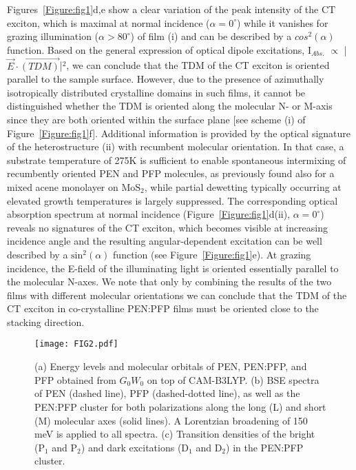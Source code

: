 \documentclass[journal=jpclcd,manuscript=letter]{achemso}
\begin{document}
Figures~\ref{Figure:fig1}d,e show a clear variation of the peak intensity of the CT exciton, which is maximal at normal incidence ($\alpha= 0^{\circ}$) while it vanishes for grazing illumination ($\alpha > 80^{\circ}$) of film (i) and can be described by a $cos^2(\alpha)$ function. Based on the general expression of optical dipole excitations, I$_{Abs.}$  $\propto$ | $\vec{E} \cdot \vec{(TDM)}$|$^2$, we can conclude that the TDM of the CT exciton is oriented parallel to the sample surface. However, due to the presence of azimuthally isotropically distributed  crystalline domains in such films, it cannot be distinguished whether the TDM is oriented along the molecular N- or M-axis since they are both oriented within the surface plane [see scheme (i) of Figure~\ref{Figure:fig1}f]. Additional information is provided by the optical signature of the heterostructure (ii) with recumbent molecular orientation. In that case, a substrate temperature of 275K is sufficient to enable spontaneous intermixing of recumbently oriented PEN and PFP molecules, as previously found also for a mixed acene monolayer on $\mathrm{MoS_2}$,\cite{kach+21cs} while partial dewetting typically occurring at elevated growth temperatures is largely suppressed. The corresponding optical absorption spectrum at normal incidence (Figure~\ref{Figure:fig1}d(ii), $\alpha= 0^{\circ}$) reveals no signatures of the CT exciton, which becomes visible at increasing incidence angle and the resulting angular-dependent excitation can be well described by a $\mathrm{sin^2}(\alpha )$ function (see Figure~\ref{Figure:fig1}e). At grazing incidence, the E-field of the illuminating light is oriented essentially parallel to the molecular N-axes. We note that only by combining the results of the two films with different molecular orientations we can conclude that the TDM of the CT exciton in co-crystalline PEN:PFP films must be oriented close to the stacking direction.


%
\begin{figure}[h!]
	\centering
	\texttt{[image: FIG2.pdf]}
	\caption{(a) Energy levels and molecular orbitals of PEN, PEN:PFP, and PFP obtained from $G_0W_0$ on top of CAM-B3LYP. (b) BSE spectra of PEN (dashed line), PFP (dashed-dotted line), as well as the PEN:PFP cluster for both polarizations along the long (L) and short (M) molecular axes (solid lines). A Lorentzian broadening of 150 meV is applied to all spectra. (c) Transition densities of the bright (P$_1$ and P$_2$) and dark excitations (D$_1$ and D$_2$) in the PEN:PFP cluster. }
		\label{fig:cluster}
\end{figure}
%
\end{document}
